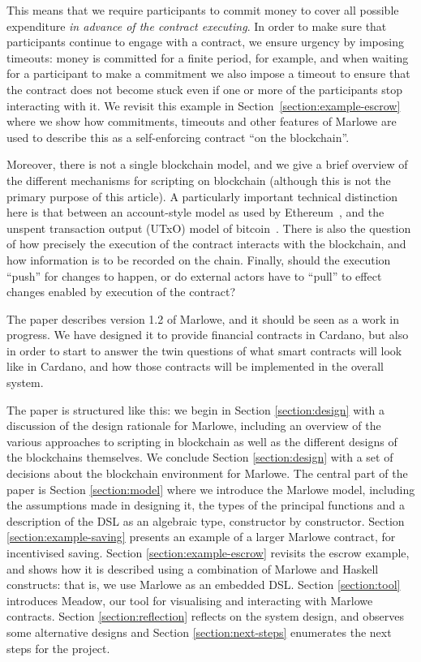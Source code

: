 \documentclass[runningheads]{llncs}
\begin{document}
This means that we require participants to commit money to cover all possible expenditure \emph{in advance of the 
contract executing}. In order to make sure that participants continue to engage with a contract, we ensure urgency by 
imposing timeouts: money is committed for a finite period, for example, and when waiting for a participant to make a 
commitment we also impose a timeout to ensure that the contract does not become stuck even if one or more of the 
participants stop interacting with it. We revisit this example in Section~\ref{section:example-escrow} where we show how 
commitments, timeouts and other features of Marlowe are used to describe this as a self-enforcing contract ``on the 
blockchain''.

Moreover, there is not a single blockchain model, and we give a brief overview of the different mechanisms for 
scripting on blockchain (although this is not the primary purpose of this article). 
A particularly important technical distinction here is that between an account-style model as used by 
Ethereum~\cite{EthereumRationale}, and the unspent transaction output (UTxO) model of bitcoin~\cite{sok}. 
There is also the question of how precisely the execution of the contract interacts with the blockchain, and how 
information is to be recorded on the chain. Finally, should the execution ``push'' for changes  to happen, or do 
external actors have to ``pull'' to effect changes enabled by execution of the contract?

The paper describes version 1.2 of Marlowe, and it should be seen as a work in progress. We have designed it to provide 
financial contracts in Cardano, but also in order to start to answer the twin questions of what smart contracts will 
look like in Cardano, and how those contracts will be implemented in the overall system.

The paper is structured like this: we begin in Section \ref{section:design} with a discussion of the design rationale 
for Marlowe, including an overview of the various approaches to scripting in blockchain as well as the different designs 
of the blockchains themselves. We conclude Section \ref{section:design} with a set of decisions about the blockchain 
environment for Marlowe. The central part of the paper is Section \ref{section:model} where we introduce the Marlowe 
model, including the assumptions made in designing it, the types of the principal functions and a description of the DSL 
as an algebraic type, constructor by constructor. Section \ref{section:example-saving} presents an example of a larger 
Marlowe contract, for incentivised saving. Section \ref{section:example-escrow} revisits the escrow example, and shows 
how it is described using a combination of Marlowe and Haskell constructs: that is, we use Marlowe as an embedded DSL. 
Section \ref{section:tool} introduces Meadow, our tool for visualising and interacting with Marlowe contracts.
Section \ref{section:reflection} reflects on the system design, and observes some alternative designs and Section 
\ref{section:next-steps} enumerates the next steps for the project.
\end{document}
